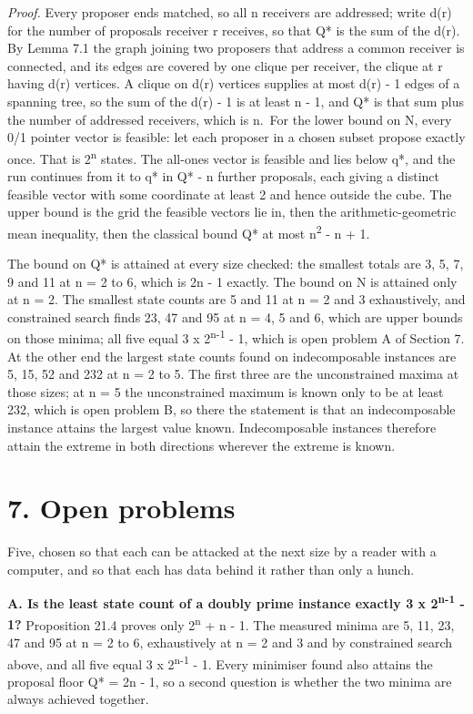 \documentclass[
  11pt,
]{article}
\begin{document}
\emph{Proof.} Every proposer ends matched, so all n receivers are
addressed; write d(r) for the number of proposals receiver r receives,
so that Q* is the sum of the d(r). By Lemma 7.1 the graph joining two
proposers that address a common receiver is connected, and its edges are
covered by one clique per receiver, the clique at r having d(r)
vertices. A clique on d(r) vertices supplies at most d(r) - 1 edges of a
spanning tree, so the sum of the d(r) - 1 is at least n - 1, and Q* is
that sum plus the number of addressed receivers, which is n.~For the
lower bound on N, every 0/1 pointer vector is feasible: let each
proposer in a chosen subset propose exactly once. That is
2\textsuperscript{n} states. The all-ones vector is feasible and lies
below q*, and the run continues from it to q* in Q* - n further
proposals, each giving a distinct feasible vector with some coordinate
at least 2 and hence outside the cube. The upper bound is the grid the
feasible vectors lie in, then the arithmetic-geometric mean inequality,
then the classical bound Q* at most n\textsuperscript{2} - n + 1.

The bound on Q* is attained at every size checked: the smallest totals
are 3, 5, 7, 9 and 11 at n = 2 to 6, which is 2n - 1 exactly. The bound
on N is attained only at n = 2. The smallest state counts are 5 and 11
at n = 2 and 3 exhaustively, and constrained search finds 23, 47 and 95
at n = 4, 5 and 6, which are upper bounds on those minima; all five
equal 3 x 2\textsuperscript{n-1} - 1, which is open problem A of Section
7. At the other end the largest state counts found on indecomposable
instances are 5, 15, 52 and 232 at n = 2 to 5. The first three are the
unconstrained maxima at those sizes; at n = 5 the unconstrained maximum
is known only to be at least 232, which is open problem B, so there the
statement is that an indecomposable instance attains the largest value
known. Indecomposable instances therefore attain the extreme in both
directions wherever the extreme is known.

\clearpage

\hypertarget{open-problems}{%
\section{7. Open problems}\label{open-problems}}

Five, chosen so that each can be attacked at the next size by a reader
with a computer, and so that each has data behind it rather than only a
hunch.

\textbf{A. Is the least state count of a doubly prime instance exactly 3
x 2\textsuperscript{n-1} - 1?} Proposition 21.4 proves only
2\textsuperscript{n} + n - 1. The measured minima are 5, 11, 23, 47 and
95 at n = 2 to 6, exhaustively at n = 2 and 3 and by constrained search
above, and all five equal 3 x 2\textsuperscript{n-1} - 1. Every
minimiser found also attains the proposal floor Q* = 2n - 1, so a second
question is whether the two minima are always achieved together.
\end{document}
